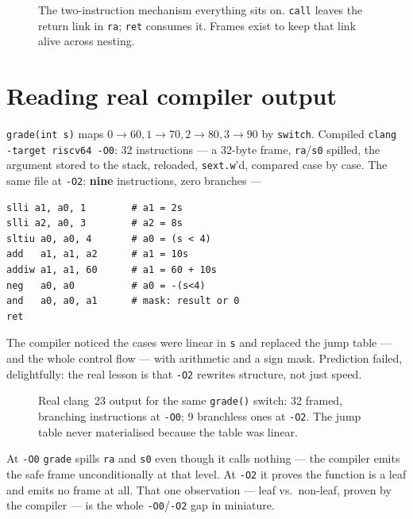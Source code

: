 \begin{figure}[t]
\centering

\caption[call/ret mechanism]{The two-instruction mechanism everything
sits on. \texttt{call} leaves the return link in \texttt{ra};
\texttt{ret} consumes it. Frames exist to keep that link alive across
nesting.}
\label{fig:callret04}
\end{figure}

\section{Reading real compiler output}
\label{sec:readasm04}

\begin{example}[-O0 vs -O2 on a switch]\label{ex:switch04}
\texttt{grade(int s)} maps $0\to60, 1\to70, 2\to80, 3\to90$ by
\texttt{switch}. Compiled \texttt{clang -target riscv64 -O0}: 32
instructions --- a 32-byte frame, \texttt{ra}/\texttt{s0} spilled, the
argument stored to the stack, reloaded, \texttt{sext.w}'d, compared
case by case. The same file at \texttt{-O2}: \textbf{nine}
instructions, zero branches ---
\begin{lstlisting}
slli a1, a0, 1        # a1 = 2s
slli a2, a0, 3        # a2 = 8s
sltiu a0, a0, 4       # a0 = (s < 4)
add   a1, a1, a2      # a1 = 10s
addiw a1, a1, 60      # a1 = 60 + 10s
neg   a0, a0          # a0 = -(s<4)
and   a0, a0, a1      # mask: result or 0
ret
\end{lstlisting}
The compiler noticed the cases were linear in \texttt{s} and replaced
the jump table --- and the whole control flow --- with arithmetic and
a sign mask. Prediction failed, delightfully: the real lesson is that
\texttt{-O2} rewrites structure, not just speed.
\end{example}

\begin{figure}[t]
\centering

\caption[-O0 vs -O2 codegen]{Real clang~23 output for the same
\texttt{grade()} switch: 32 framed, branching instructions at
\texttt{-O0}; 9 branchless ones at \texttt{-O2}. The jump table never
materialised because the table was linear.}
\label{fig:codegen04}
\end{figure}

\begin{checkpoint}\label{cp:frame04}
At \texttt{-O0} \texttt{grade} spills \texttt{ra} and \texttt{s0} even
though it calls nothing --- the compiler emits the safe frame
unconditionally at that level. At \texttt{-O2} it proves the function
is a leaf and emits no frame at all. That one observation --- leaf
vs.\ non-leaf, proven by the compiler --- is the whole
\texttt{-O0}/\texttt{-O2} gap in miniature.
\end{checkpoint}

